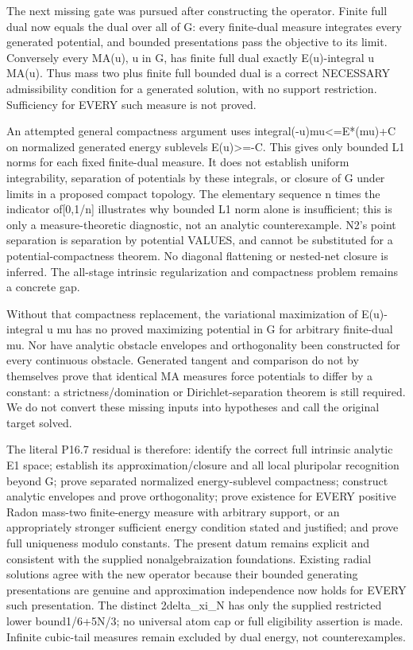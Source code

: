 \documentclass[11pt]{article}
\begin{document}
The next missing gate was pursued after constructing the operator. Finite full dual now equals the dual over all of G: every finite-dual measure integrates every generated potential, and bounded presentations pass the objective to its limit. Conversely every MA(u), u in G, has finite full dual exactly E(u)-integral u MA(u). Thus mass two plus finite full bounded dual is a correct NECESSARY admissibility condition for a generated solution, with no support restriction. Sufficiency for EVERY such measure is not proved.

An attempted general compactness argument uses integral(-u)mu<=E*(mu)+C on normalized generated energy sublevels E(u)>=-C. This gives only bounded L1 norms for each fixed finite-dual measure. It does not establish uniform integrability, separation of potentials by these integrals, or closure of G under limits in a proposed compact topology. The elementary sequence n times the indicator of[0,1/n] illustrates why bounded L1 norm alone is insufficient; this is only a measure-theoretic diagnostic, not an analytic counterexample. N2's point separation is separation by potential VALUES, and cannot be substituted for a potential-compactness theorem. No diagonal flattening or nested-net closure is inferred. The all-stage intrinsic regularization and compactness problem remains a concrete gap.

Without that compactness replacement, the variational maximization of E(u)-integral u mu has no proved maximizing potential in G for arbitrary finite-dual mu. Nor have analytic obstacle envelopes and orthogonality been constructed for every continuous obstacle. Generated tangent and comparison do not by themselves prove that identical MA measures force potentials to differ by a constant: a strictness/domination or Dirichlet-separation theorem is still required. We do not convert these missing inputs into hypotheses and call the original target solved.

The literal P16.7 residual is therefore: identify the correct full intrinsic analytic E1 space; establish its approximation/closure and all local pluripolar recognition beyond G; prove separated normalized energy-sublevel compactness; construct analytic envelopes and prove orthogonality; prove existence for EVERY positive Radon mass-two finite-energy measure with arbitrary support, or an appropriately stronger sufficient energy condition stated and justified; and prove full uniqueness modulo constants. The present datum remains explicit and consistent with the supplied nonalgebraization foundations. Existing radial solutions agree with the new operator because their bounded generating presentations are genuine and approximation independence now holds for EVERY such presentation. The distinct 2delta\_xi\_N has only the supplied restricted lower bound1/6+5N/3; no universal atom cap or full eligibility assertion is made. Infinite cubic-tail measures remain excluded by dual energy, not counterexamples.
\end{document}
